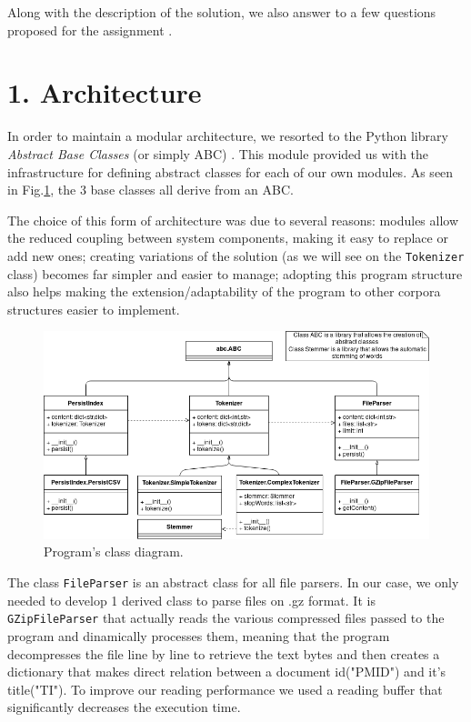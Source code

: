 \documentclass[12pt]{article}
\begin{document}
Along with the description of the solution, we also answer to a few questions
proposed for the assignment \cite{assign1}.

\newpage
\section*{1. Architecture}

In order to maintain a modular architecture, we resorted to the Python library 
{\it Abstract Base Classes\/} (or simply ABC) \cite{abclib}.
This module provided us with the infrastructure for defining abstract classes
for each of our own modules.
As seen in Fig.\ref{fig:classdiagram}, the 3 base classes all derive from 
an ABC.

The choice of this form of architecture was due to several reasons: modules
allow the reduced coupling between system components, making it easy to replace
or add new ones; creating variations of the solution (as we will see on the
\texttt{Tokenizer} class) becomes far simpler and easier to manage; adopting this 
program structure also helps making the extension/adaptability of the 
program to other corpora structures easier to implement.

\begin{figure}[h!]
  \includegraphics[width=\linewidth]{ClassDiagram.png}
  \caption{Program's class diagram.}
  \label{fig:classdiagram}
\end{figure}

The class \texttt{FileParser} is an abstract class for all file parsers.
In our case, we only needed to develop 1 derived class to parse files on
.gz format. 
It is \texttt{GZipFileParser} that actually reads the various compressed 
files passed to the program and dinamically processes them, meaning that
the program decompresses the file line by line to retrieve the text bytes 
and then creates a dictionary that makes direct relation between a document 
id("PMID") and it's title("TI").
To improve our reading performance we used a reading buffer that 
significantly decreases the execution time. 
\end{document}

